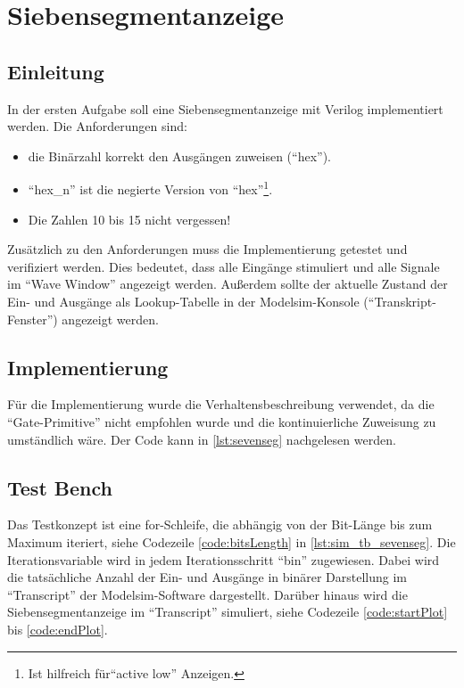 \documentclass[./\jobname.tex]{subfiles}
\begin{document}
%
\chapter{Siebensegmentanzeige}
%
\section{Einleitung}
%
In der ersten Aufgabe soll eine Siebensegmentanzeige mit Verilog implementiert werden. Die Anforderungen sind:
\begin{itemize}
	\item die Binärzahl korrekt den Ausgängen zuweisen (\enquote{hex}).
	\item \enquote{hex\_n} ist die negierte Version von \enquote{hex}\footnote{Ist hilfreich für\enquote{active low} Anzeigen.}.
	\item Die Zahlen 10 bis 15 nicht vergessen!
\end{itemize}
%
Zusätzlich zu den Anforderungen muss die Implementierung getestet und verifiziert werden. Dies bedeutet, dass alle Eingänge stimuliert und alle Signale im \enquote{Wave Window} angezeigt werden. Außerdem sollte der aktuelle Zustand der Ein- und Ausgänge als Lookup-Tabelle in der Modelsim-Konsole (\enquote{Transkript-Fenster}) angezeigt werden.
%
\section{Implementierung}
%
Für die Implementierung wurde die Verhaltensbeschreibung verwendet, da die \enquote{Gate-Primitive} nicht empfohlen wurde und die kontinuierliche Zuweisung zu umständlich wäre. Der Code kann in \autoref{lst:sevenseg} nachgelesen werden.
%

%
\section{Test Bench}
%
Das Testkonzept ist eine for-Schleife, die abhängig von der Bit-Länge bis zum Maximum iteriert, siehe Codezeile \ref{code:bitsLength} in \autoref{lst:sim_tb_sevenseg}. Die Iterationsvariable wird in jedem Iterationsschritt \enquote{bin} zugewiesen. Dabei wird die tatsächliche Anzahl der Ein- und Ausgänge in binärer Darstellung im \enquote{Transcript} der Modelsim-Software dargestellt. Darüber hinaus wird die Siebensegmentanzeige im \enquote{Transcript} simuliert, siehe Codezeile \ref{code:startPlot} bis \ref{code:endPlot}.
%

%
\end{document}
